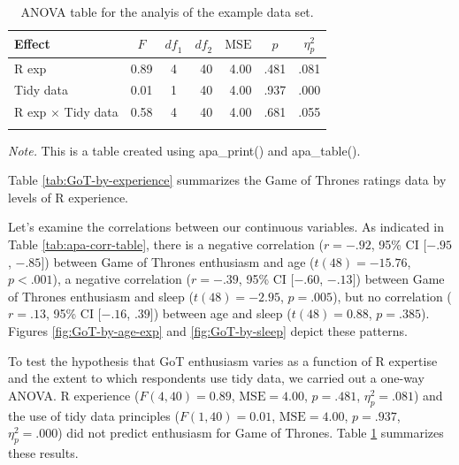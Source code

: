 \documentclass[english,man]{apa6}
\theoremstyle{definition}
\theoremstyle{definition}
\theoremstyle{remark}
\begin{document}
\begin{table}[tbp]
\begin{center}
\begin{threeparttable}
\caption{\label{tab:GoT-aov-table}ANOVA table for the analyis of the example data set.}
\begin{tabular}{lrcrrrl}
\toprule
Effect & \multicolumn{1}{c}{$F$} & \multicolumn{1}{c}{$\mathit{df}_1$} & \multicolumn{1}{c}{$\mathit{df}_2$} & \multicolumn{1}{c}{$\mathrm{MSE}$} & \multicolumn{1}{c}{$p$} & \multicolumn{1}{c}{$\eta^2_p$}\\
\midrule
R exp & 0.89 & 4 & 40 & 4.00 & .481 & .081\\
Tidy data & 0.01 & 1 & 40 & 4.00 & .937 & .000\\
R exp $\times$ Tidy data & 0.58 & 4 & 40 & 4.00 & .681 & .055\\
\bottomrule
\addlinespace
\end{tabular}
\begin{tablenotes}[para]
\textit{Note.} This is a table created using apa\_print() and apa\_table().
\end{tablenotes}
\end{threeparttable}
\end{center}
\end{table}

Table \ref{tab:GoT-by-experience} summarizes the Game of Thrones ratings
data by levels of R experience.

Let's examine the correlations between our continuous variables. As
indicated in Table \ref{tab:apa-corr-table}, there is a negative
correlation (\(r = -.92\), 95\% CI \([-.95\), \(-.85]\)) between Game of
Thrones enthusiasm and age (\(t(48) = -15.76\), \(p < .001\)), a
negative correlation (\(r = -.39\), 95\% CI \([-.60\), \(-.13]\))
between Game of Thrones enthusiasm and sleep (\(t(48) = -2.95\),
\(p = .005\)), but no correlation (\(r = .13\), 95\% CI \([-.16\),
\(.39]\)) between age and sleep (\(t(48) = 0.88\), \(p = .385\)).
Figures \ref{fig:GoT-by-age-exp} and \ref{fig:GoT-by-sleep} depict these
patterns.

To test the hypothesis that GoT enthusiasm varies as a function of R
expertise and the extent to which respondents use tidy data, we carried
out a one-way ANOVA. R experience (\(F(4, 40) = 0.89\),
\(\mathrm{MSE} = 4.00\), \(p = .481\), \(\eta^2_p = .081\)) and the use
of tidy data principles (\(F(1, 40) = 0.01\), \(\mathrm{MSE} = 4.00\),
\(p = .937\), \(\eta^2_p = .000\)) did not predict enthusiasm for Game
of Thrones. Table \ref{tab:GoT-aov-table} summarizes these results.
\end{document}
